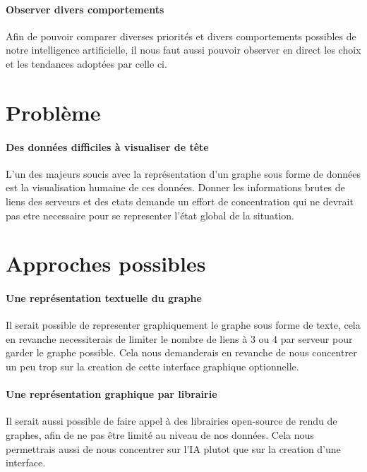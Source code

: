 \documentclass{scrreprt}
\begin{document}
    \paragraph{Observer divers comportements}
    Afin de pouvoir comparer diverses priorités et divers comportements
    possibles de notre intelligence artificielle, il nous faut aussi pouvoir
    observer en direct les choix et les tendances adoptées par celle ci.

    \section{Problème}

    \paragraph{Des données difficiles à visualiser de tête}
    L'un des majeurs soucis avec la représentation d'un graphe sous forme de
    données est la visualisation humaine de ces données.
    Donner les informations brutes de liens des serveurs et des etats demande
    un effort de concentration qui ne devrait pas etre necessaire pour se
    representer l'état global de la situation.

    \section{Approches possibles}

    \paragraph{Une représentation textuelle du graphe}
    Il serait possible de representer graphiquement le graphe sous forme de
    texte, cela en revanche necessiterais de limiter le nombre de liens à 3
    ou 4 par serveur pour garder le graphe possible.
    Cela nous demanderais en revanche de nous concentrer un peu trop sur
    la creation de cette interface graphique optionnelle.

    \paragraph{Une représentation graphique par librairie}
    Il serait aussi possible de faire appel à des librairies open-source de
    rendu de graphes, afin de ne pas être limité au niveau de nos données.
    Cela nous permettrais aussi de nous concentrer sur l'IA plutot que sur la
    creation d'une interface.
\end{document}
